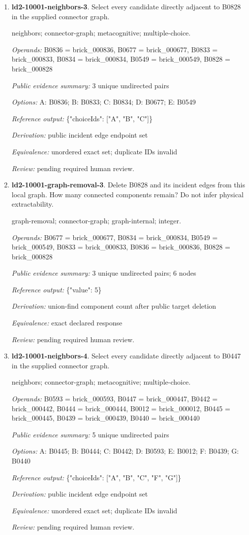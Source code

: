 \begin{enumerate}
\item \textbf{ld2-10001-neighbors-3}. Select every candidate directly adjacent to B0828 in the supplied connector graph.
\par{\small neighbors; connector-graph; metacognitive; multiple-choice.\par\textit{Operands:} B0836 = brick\_000836, B0677 = brick\_000677, B0833 = brick\_000833, B0834 = brick\_000834, B0549 = brick\_000549, B0828 = brick\_000828\par\textit{Public evidence summary:} 3 unique undirected pairs\par\textit{Options:} A: B0836; B: B0833; C: B0834; D: B0677; E: B0549\par\textit{Reference output:} \{"choiceIds": ["A", "B", "C"]\}\par\textit{Derivation:} public incident edge endpoint set\par\textit{Equivalence:} unordered exact set; duplicate IDs invalid\par\textit{Review:} pending required human review.}
\item \textbf{ld2-10001-graph-removal-3}. Delete B0828 and its incident edges from this local graph. How many connected components remain? Do not infer physical extractability.
\par{\small graph-removal; connector-graph; graph-internal; integer.\par\textit{Operands:} B0677 = brick\_000677, B0834 = brick\_000834, B0549 = brick\_000549, B0833 = brick\_000833, B0836 = brick\_000836, B0828 = brick\_000828\par\textit{Public evidence summary:} 3 unique undirected pairs; 6 nodes\par\textit{Reference output:} \{"value": 5\}\par\textit{Derivation:} union-find component count after public target deletion\par\textit{Equivalence:} exact declared response\par\textit{Review:} pending required human review.}
\item \textbf{ld2-10001-neighbors-4}. Select every candidate directly adjacent to B0447 in the supplied connector graph.
\par{\small neighbors; connector-graph; metacognitive; multiple-choice.\par\textit{Operands:} B0593 = brick\_000593, B0447 = brick\_000447, B0442 = brick\_000442, B0444 = brick\_000444, B0012 = brick\_000012, B0445 = brick\_000445, B0439 = brick\_000439, B0440 = brick\_000440\par\textit{Public evidence summary:} 5 unique undirected pairs\par\textit{Options:} A: B0445; B: B0444; C: B0442; D: B0593; E: B0012; F: B0439; G: B0440\par\textit{Reference output:} \{"choiceIds": ["A", "B", "C", "F", "G"]\}\par\textit{Derivation:} public incident edge endpoint set\par\textit{Equivalence:} unordered exact set; duplicate IDs invalid\par\textit{Review:} pending required human review.}

\end{enumerate}
